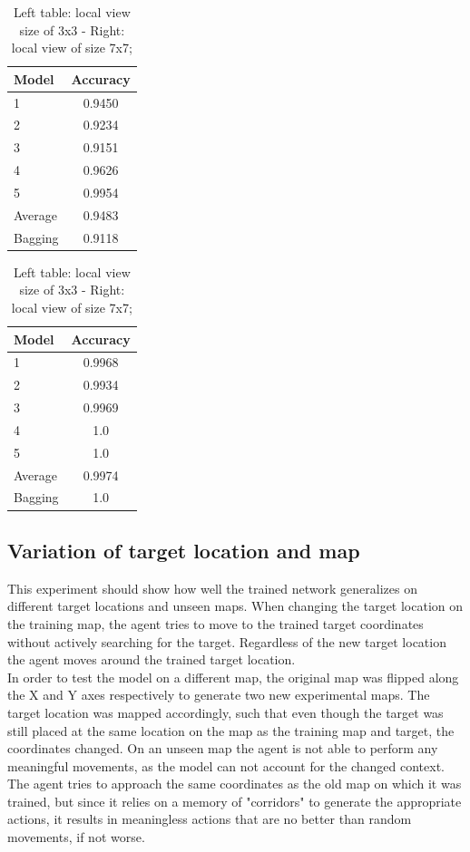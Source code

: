 \documentclass[a4paper, 11pt]{article}
\begin{document}
\begin{table}[ht]
    \centering
    \footnotesize
    \begin{tabular}[t]{p{2.5cm}c}
        \toprule
        \textbf{Model}	&	\textbf{Accuracy} \\
        \midrule
        1   &   0.9450 \\
        2	&	0.9234 \\
        3 	&	0.9151 \\
        4 	&	0.9626 \\
        5 	&	0.9954 \\
        \midrule
        Average 	&	0.9483 \\
        \midrule
        Bagging 	&	 0.9118\\
        \bottomrule
    \end{tabular}
    \begin{tabular}[t]{p{2.5cm}c}
        \toprule
        \textbf{Model}	&	\textbf{Accuracy} \\
        \midrule
        1    &	0.9968  \\
        2	&	0.9934 \\
        3 	&	0.9969 \\
        4 	&	1.0 \\
        5 	&	1.0 \\
        \midrule
        Average 	&	0.9974 \\
        \midrule
        Bagging 	&	 1.0\\
        \bottomrule
    \end{tabular}

    \caption{Left table: local view size of 3x3 - Right: local view of size 7x7; }
    \label{tbl:local_view}
\end{table}

\subsection*{Variation of target location and map}
This experiment should show how well the trained network generalizes on different target locations and unseen maps. When changing the target location on the training map, the agent tries to move to the trained target coordinates without actively searching for the target. Regardless of the new target location the agent moves around the trained target location.\\
In order to test the model on a different map, the original map was flipped along the X and Y axes respectively to generate two new experimental maps. The target location was mapped accordingly, such that even though the target was still placed at the same location on the map as the training map and target, the coordinates changed. On an unseen map the agent is not able to perform any meaningful movements, as the model can not account for the changed context. The agent tries to approach the same coordinates as the old map on which it was trained, but since it relies on a memory of "corridors" to generate the appropriate actions, it results in meaningless actions that are no better than random movements, if not worse.
\end{document}
